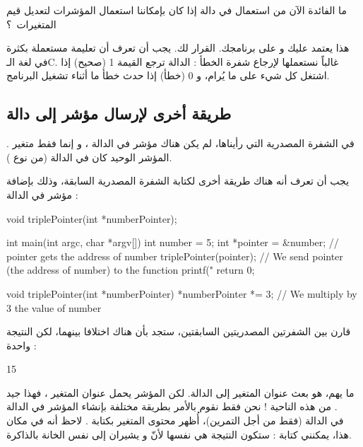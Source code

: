 \begin{question}
	ما الفائدة الآن من استعمال
في دالة إذا كان بإمكاننا استعمال المؤشرات لتعديل قيم المتغيرات~؟
\end{question}

هذا يعتمد عليك و على برنامجك. القرار لك. يجب أن تعرف أن تعليمة
مستعملة بكثرة في لغة الـ\textenglish{C}.
غالباً نستعملها لإرجاع شفرة الخطأ : الدالة ترجع القيمة 1 (صحيح) إذا اشتغل كل شيء على ما يُرام، و 0 (خطأ) إذا حدث خطأ ما أثناء تشغيل البرنامج.

\subsection{طريقة أخرى لإرسال مؤشر إلى دالة}
في الشفرة المصدرية التي رأيناها، لم يكن هناك مؤشر في الدالة
،
و إنما فقط متغير
.
المؤشر الوحيد كان في الدالة
(من نوع
).

يجب أن تعرف أنه هناك طريقة أخرى لكتابة الشفرة المصدرية السابقة، وذلك بإضافة مؤشر في الدالة
 :

\begin{Csource}
void triplePointer(int *numberPointer);

int main(int argc, char *argv[])
{
	int number = 5;
	int *pointer = &number; // pointer gets the address of number
	triplePointer(pointer); // We send pointer (the address of number) to the function
	printf("%
	return 0;
}

void triplePointer(int *numberPointer)
{
	*numberPointer *= 3; // We multiply by 3 the value of number
}
\end{Csource}

قارن بين الشفرتين المصدريتين السابقتين، ستجد بأن هناك اختلافا بينهما، لكن النتيجة واحدة :

\begin{Console}
15
\end{Console}

ما يهم، هو بعث عنوان المتغير
إلى الدالة. لكن المؤشر يحمل عنوان المتغير
،
فهذا جيد من هذه الناحية ! نحن فقط نقوم بالأمر بطريقة مختلفة بإنشاء المؤشر في الدالة
.\\
في الدالة
(فقط من أجل التمرين)، أُظهر محتوى المتغير
بكتابة
.
لاحظ أنه في مكان هذا، يمكنني كتابة
: ستكون النتيجة هي نفسها لأنّ
و
يشيران إلى نفس الخانة بالذاكرة.


